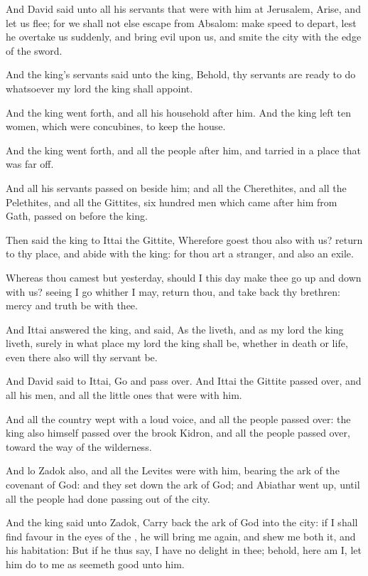 \verse And David said unto all his servants that were with him at Jerusalem, Arise, and let us flee; for we shall not else escape from Absalom: make speed to depart, lest he overtake us suddenly, and bring evil upon us, and smite the city with the edge of the sword.

\verse And the king's servants said unto the king, Behold, thy servants are ready to do whatsoever my lord the king shall appoint.

\verse And the king went forth, and all his household after him. And the king left ten women, which were concubines, to keep the house.

\verse And the king went forth, and all the people after him, and tarried in a place that was far off.

\verse And all his servants passed on beside him; and all the Cherethites, and all the Pelethites, and all the Gittites, six hundred men which came after him from Gath, passed on before the king.

\verse Then said the king to Ittai the Gittite, Wherefore goest thou also with us? return to thy place, and abide with the king: for thou art a stranger, and also an exile.

\verse Whereas thou camest but yesterday, should I this day make thee go up and down with us? seeing I go whither I may, return thou, and take back thy brethren: mercy and truth be with thee.

\verse And Ittai answered the king, and said, As the \LORD liveth, and as my lord the king liveth, surely in what place my lord the king shall be, whether in death or life, even there also will thy servant be.

\verse And David said to Ittai, Go and pass over. And Ittai the Gittite passed over, and all his men, and all the little ones that were with him.

\verse And all the country wept with a loud voice, and all the people passed over: the king also himself passed over the brook Kidron, and all the people passed over, toward the way of the wilderness.

\verse And lo Zadok also, and all the Levites were with him, bearing the ark of the covenant of God: and they set down the ark of God; and Abiathar went up, until all the people had done passing out of the city.

\verse And the king said unto Zadok, Carry back the ark of God into the city: if I shall find favour in the eyes of the \LORD, he will bring me again, and shew me both it, and his habitation: \verse But if he thus say, I have no delight in thee; behold, here am I, let him do to me as seemeth good unto him.


